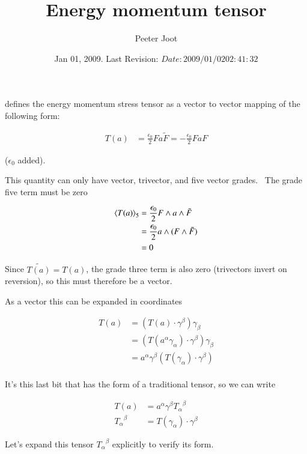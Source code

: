 \documentclass{article}
\title{ Energy momentum tensor }
\author{Peeter Joot}
\date{ Jan 01, 2009.  Last Revision: $Date: 2009/01/02 02:41:32 $ }
\begin{document}
\maketitle{}


\cite{doran2003gap} defines the energy momentum stress tensor as a vector to
vector mapping of the following form:

\begin{align*}
T(a) 
&= \frac{\epsilon_0}{2} F a \tilde{F}
= - \frac{\epsilon_0}{2} F a F
\end{align*}

($\epsilon_0$ added).

This quantity can only have vector, trivector, and five vector grades.  The 
grade five term must be zero

\begin{align*}
{\left\langle{{T(a)}}\right\rangle}_{5}
&= \frac{\epsilon_0}{2} F \wedge a \wedge \tilde{F} \\
&= \frac{\epsilon_0}{2} a \wedge (F \wedge \tilde{F}) \\
&= 0
\end{align*}

Since $\tilde{T(a)} = T(a)$, the grade three term is also zero (trivectors invert on reversion), so this must therefore be a vector.

As a vector this can be expanded in coordinates

\begin{align*}
T(a) 
&= \left(T(a) \cdot \gamma^\beta \right) \gamma_\beta \\
&= \left(T(a^\alpha \gamma_\alpha) \cdot \gamma^\beta \right) \gamma_\beta \\
&= a^\alpha \gamma^\beta \left(T(\gamma_\alpha) \cdot \gamma^\beta \right) \\
\end{align*}

It's this last bit that has the form of a traditional tensor, so we can write

\begin{align*}
T(a) &= a^\alpha \gamma^\beta {T_\alpha}^{\beta} \\
{T_\alpha}^{\beta} &= T(\gamma_\alpha) \cdot \gamma^\beta 
\end{align*}

Let's expand this tensor ${T_\alpha}^{\beta}$ explicitly to verify its form.
\end{document}
